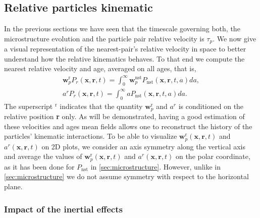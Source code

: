 \subsection{Relative particles kinematic}

In the previous sections we have seen that the timescale governing both, the microstructure evolution and the particle pair relative velocity is $\tau_p$.   
We now give a visual representation of the nearest-pair's relative velocity in space to better understand how the relative kinematics behaves.  
To that end we compute the nearest relative velocity and age, averaged on all ages, that is,
\begin{align*}
    \textbf{w}^\text{r}_pP_r(\textbf{x},\textbf{r},t)
    =\int_0^\infty \textbf{w}^\text{nst}_pP_\text{nst}(\textbf{x},\textbf{r},t,a) da,\\
    a^rP_r(\textbf{x},\textbf{r},t)
    =\int_0^\infty a P_\text{nst}(\textbf{x},\textbf{r},t,a) da.
\end{align*}
The superscript $^\text{r}$ indicates that the quantity $\textbf{w}^\text{r}_p$ and $a^r$ is conditioned on the relative position \textbf{r} only.
As will be demonstrated, having a good estimation of these velocities and ages mean fields allows one to reconstruct the history of the particles' kinematic interactions. 
To be able to visualize
$\textbf{w}^\text{r}_p(\textbf{x},\textbf{r},t)$
and 
$a^r(\textbf{x},\textbf{r},t)$
on 2D plots, we consider an axis symmetry along the vertical axis and average the values of 
$\textbf{w}^\text{r}_p(\textbf{x},\textbf{r},t)$
and $a^r(\textbf{x},\textbf{r},t)$
on the polar coordinate, as it has been done for $P_\text{nst}$ in \ref{sec:microstructure}. 
However, unlike in \ref{sec:microstructure} we do not assume symmetry with respect to the horizontal plane. 

\subsubsection{Impact of the inertial effects}

